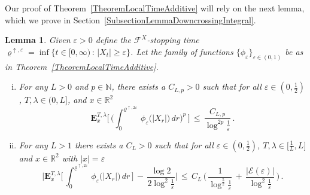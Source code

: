 \documentclass[10pt]{article}
\numberwithin{equation}{section}
\newtheorem{lemma}[theorem]{Lemma}
\theoremstyle{definition}
\newcommand{\R}{{\mathbb R}}
\begin{document}
Our proof of Theorem~\ref{TheoremLocalTimeAdditive} will rely on the next lemma, which we prove in Section~\ref{SubsectionLemmaDowncrossingIntegral}.
\begin{lemma}\label{LemmaDowncrossingIntegral} Given  $\varepsilon>0$  define the $\mathscr{F}^X$-stopping time
$\varrho^{\uparrow, \varepsilon}=\inf\{ t\in [0,\infty)\,:\, |X_t| \geq \varepsilon   \}$.   Let the family of functions $\{\phi_{\varepsilon}\}_{\varepsilon\in (0,1)}$ be as in Theorem~\ref{TheoremLocalTimeAdditive}.
\begin{enumerate}[(i)]
\item For any $L >0$ and $p\in \mathbb{N}$, there exists a $C_{L,p}>0 $  such that for all $\varepsilon \in (0,\frac{1}{2})$, $T,\lambda \in (0,  L]$, and  $x\in \R^2 $
$$  \mathbf{E}^{T ,\lambda}_{x}\Bigg[ \,\bigg(\int_{ 0}^{\varrho^{\uparrow,2\varepsilon} }\,      \phi_{\varepsilon}\big(|X_r|\big)\,dr\bigg)^p \, \Bigg] \,\leq \, \frac{ C_{L,p}}{\log^{2p} \frac{1}{\varepsilon}  } \,.  $$


\item For any $L >1$ there exists a $C_{L}>0$ such that for all $\varepsilon \in (0,\frac{1}{2})$, $T,\lambda\in \big[\frac{1}{L}, L]$ and  $x\in \R^2 $ with $|x|=\varepsilon$
$$  
\Bigg|  \mathbf{E}^{T ,\lambda}_{x}\bigg[\, \int_{ 0}^{\varrho^{\uparrow,2\varepsilon} } \,     \phi_{\varepsilon}\big(|X_r|\big)\,dr \, \bigg] \,-\, \frac{ \log 2 }{2\log^2 \frac{1}{\varepsilon  }   } \Bigg| \,\leq \, C_L\,\bigg(\,\frac{ 1}{ \log^{\frac{5}{2}} \frac{1}{\varepsilon  }  }\,+\,\frac{ |\mathcal{E}(\varepsilon)|}{  \log^{2} \frac{1}{\varepsilon  } }\,\bigg)  
 \,.  $$


\end{enumerate}

\end{lemma}
\end{document}
